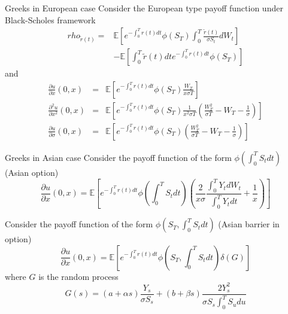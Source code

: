 \documentclass{beamer}
\begin{document}
\begin{frame}{Greeks in European case}
Consider the European type payoff function under Black-Scholes framework
\begin{eqnarray*}
rho_{\tilde{r}(t)}  = & \mathbb{E}\left[ e^{-\int_0^T r(t)dt } \phi(S_T) \int_0^T \frac{\tilde{r}(t)}{\sigma S_t} dW_t \right]  \\
 & -\mathbb{E}\left[ \int_0^T \tilde{r}(t)dt e^{-\int_0^T r(t)dt } \phi(S_T) \right]
\end{eqnarray*}
and
\begin{eqnarray*}
\frac{\partial u}{\partial x}(0,x) &=& \mathbb{E}\left[ e^{-\int_0^T r(t)dt } \phi(S_T)  \frac{W_T}{x\sigma T} \right] \\
\frac{\partial^2 u}{\partial x^2}(0,x) &=& \mathbb{E}\left[ e^{-\int_0^T r(t)dt } \phi(S_T)  \frac{1}{x^2\sigma T} \left(\frac{W_T^2}{\sigma T}-W_T-\frac{1}{\sigma}\right) \right] \\
\frac{\partial u}{\partial \sigma}(0,x) &=& \mathbb{E}\left[ e^{-\int_0^T r(t)dt } \phi(S_T)  \left(\frac{W_T^2}{\sigma T}-W_T-\frac{1}{\sigma}\right) \right]
\end{eqnarray*}
\end{frame}


\begin{frame}{Greeks in Asian case}
Consider the payoff function of the form $\phi(\int_0^T S_t dt)$ (Asian option)
$$
\frac{\partial u}{\partial x}(0,x) = \mathbb{E}\left[ e^{-\int_0^T r(t)dt } \phi(\int_0^T S_t dt)  \left( \frac{2}{x\sigma} \frac{\int_0^T Y_t dW_t}{\int_0^T Y_t dt} + \frac{1}{x}\right) \right]
$$

Consider the payoff function of the form $\phi(S_T,\int_0^T S_t dt)$ (Asian barrier in option)
$$
\frac{\partial u}{\partial x}(0,x) = \mathbb{E}\left[ e^{-\int_0^T r(t)dt } \phi\left(S_T,\int_0^T S_t dt\right) \delta(G) \right]
$$
where $G$ is the random process
$$
G(s) = (a + \alpha s) \frac{Y_s}{\sigma S_s} + (b+\beta s) \frac{2Y_s^2}{\sigma S_s \int_0^T S_u du}
$$
\end{frame}
\end{document}
